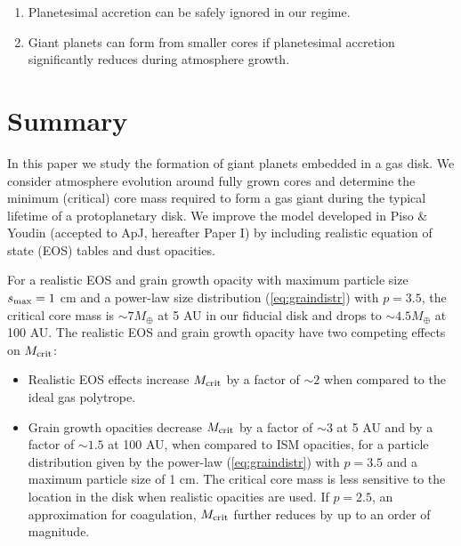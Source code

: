 \documentclass[apj]{emulateapj}
\begin{document}
\begin{enumerate}
\item Planetesimal accretion can be safely ignored in our regime.
\item Giant planets can form from smaller cores if planetesimal accretion significantly reduces during atmosphere growth. 
\end{enumerate}





 \section{Summary}
 \label{conclusions}
 
 In this paper we study the formation of giant planets embedded in a gas disk. We consider atmosphere evolution around fully grown cores and determine the minimum (critical) core mass required to form a gas giant during the typical lifetime of a protoplanetary disk. We improve the model developed in Piso \& Youdin (accepted to ApJ, hereafter Paper I) by including realistic equation of state (EOS) tables and dust opacities. 
 
 For a realistic EOS and grain growth opacity with maximum particle size $s_{\rm max}=1$ cm and a power-law size distribution (\ref{eq:graindistr}) with $p=3.5$, the critical core mass is $\sim$$7 M_{\oplus}$ at 5 AU in our fiducial disk and drops to $\sim$$4.5 M_{\oplus}$ at 100 AU. The realistic EOS and grain growth opacity have two competing effects on $M_{\rm crit}$:
 
 \begin{itemize}
 \item Realistic EOS effects increase $M_{\rm crit}$ by a factor of $\sim$$2$ when compared to the ideal gas polytrope.
 \item Grain growth opacities decrease $M_{\rm crit}$ by a factor of $\sim$$3$ at 5 AU and by a factor of $\sim$$1.5$ at 100 AU, when compared to ISM opacities, for a particle distribution given by the power-law (\ref{eq:graindistr}) with $p=3.5$ and a maximum particle size of 1 cm. The critical core mass is less sensitive to the location in the disk when realistic opacities are used. If $p=2.5$, an approximation for coagulation,  $M_{\rm crit}$ further reduces by up to an order of magnitude. 
 \end{itemize}
 
\end{document}
